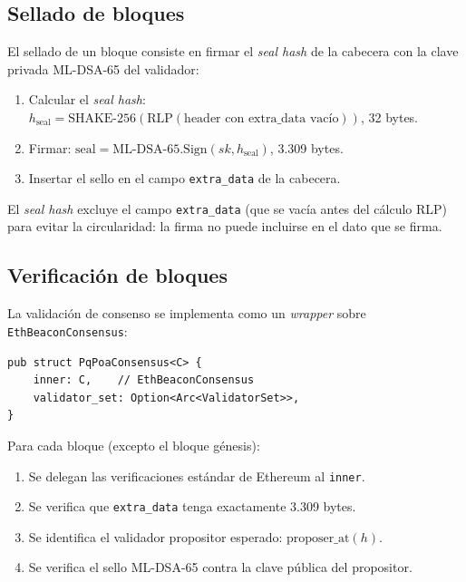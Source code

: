 \subsection{Sellado de bloques}

El sellado de un bloque consiste en firmar el \emph{seal hash} de la cabecera con la clave privada ML-DSA-65 del validador:

\begin{enumerate}
  \item Calcular el \emph{seal hash}: $h_{\text{seal}} = \text{SHAKE-256}(\text{RLP}(\text{header con extra\_data vacío}))$, 32 bytes.
  \item Firmar: $\text{seal} = \text{ML-DSA-65.Sign}(\mathit{sk}, h_{\text{seal}})$, 3.309 bytes.
  \item Insertar el sello en el campo \texttt{extra\_data} de la cabecera.
\end{enumerate}

El \emph{seal hash} excluye el campo \texttt{extra\_data} (que se vacía antes del cálculo RLP) para evitar la circularidad: la firma no puede incluirse en el dato que se firma.

\subsection{Verificación de bloques}

La validación de consenso se implementa como un \emph{wrapper} sobre \texttt{EthBeaconConsensus}:

\begin{lstlisting}[style=rustcode, caption={Consenso PoA: validación de bloques.}, label={lst:poa_consensus}]
pub struct PqPoaConsensus<C> {
    inner: C,    // EthBeaconConsensus
    validator_set: Option<Arc<ValidatorSet>>,
}
\end{lstlisting}

Para cada bloque (excepto el bloque génesis):
\begin{enumerate}
  \item Se delegan las verificaciones estándar de Ethereum al \texttt{inner}.
  \item Se verifica que \texttt{extra\_data} tenga exactamente 3.309 bytes.
  \item Se identifica el validador propositor esperado: $\text{proposer\_at}(h)$.
  \item Se verifica el sello ML-DSA-65 contra la clave pública del propositor.
\end{enumerate}

